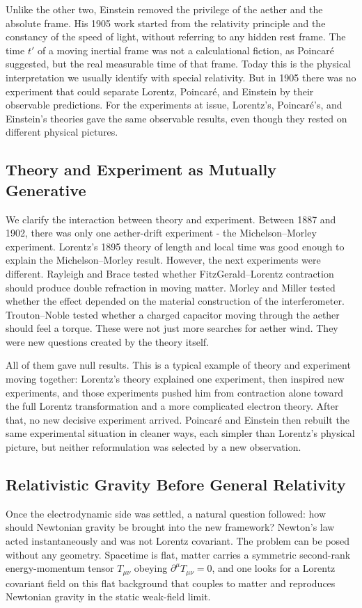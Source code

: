 \documentclass{article}
\begin{document}
Unlike the other two, Einstein removed the privilege of the aether and the absolute frame. His 1905 work started from the relativity principle and the constancy of the speed of light, without referring to any hidden rest frame. The time $t'$ of a moving inertial frame was not a calculational fiction, as Poincaré suggested, but the real measurable time of that frame. Today this is the physical interpretation we usually identify with special relativity. But in 1905 there was no experiment that could separate Lorentz, Poincaré, and Einstein by their observable predictions. For the experiments at issue, Lorentz's, Poincaré's, and Einstein's theories gave the same observable results, even though they rested on different physical pictures.

\subsection{Theory and Experiment as Mutually Generative}
We clarify the interaction between theory and experiment. Between 1887 and 1902, there was only one aether-drift experiment - the Michelson--Morley experiment. Lorentz's 1895 theory of length and local time was good enough to explain the Michelson--Morley result. However, the next experiments were different. Rayleigh and Brace tested whether FitzGerald--Lorentz contraction should produce double refraction in moving matter. Morley and Miller tested whether the effect depended on the material construction of the interferometer. Trouton--Noble tested whether a charged capacitor moving through the aether should feel a torque. These were not just more searches for aether wind. They were new questions created by the theory itself.

All of them gave null results. This is a typical example of theory and experiment moving together: Lorentz's theory explained one experiment, then inspired new experiments, and those experiments pushed him from contraction alone toward the full Lorentz transformation and a more complicated electron theory. After that, no new decisive experiment arrived. Poincaré and Einstein then rebuilt the same experimental situation in cleaner ways, each simpler than Lorentz's physical picture, but neither reformulation was selected by a new observation.

\subsection{Relativistic Gravity Before General Relativity}
Once the electrodynamic side was settled, a natural question followed: how should Newtonian gravity be brought into the new framework? Newton's law acted instantaneously and was not Lorentz covariant. The problem can be posed without any geometry. Spacetime is flat, matter carries a symmetric second-rank energy-momentum tensor $T_{\mu\nu}$ obeying $\partial^\mu T_{\mu\nu} = 0$, and one looks for a Lorentz covariant field on this flat background that couples to matter and reproduces Newtonian gravity in the static weak-field limit.
\end{document}
